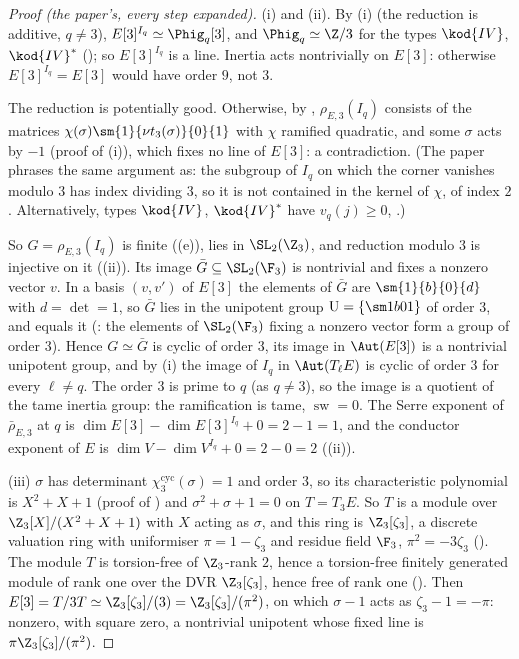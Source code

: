 \begin{proof}[Proof (the paper's, every step expanded)]
(i) and (ii). By (i) (the reduction is additive, $q\ne3$), $E[3]^{I_q}\simeq\Phig_q[3]$, and $\Phig_q\simeq\Z/3$ for the types
$\kod{IV}$, $\kod{IV}^*$ (); so $E[3]^{I_q}$ is a line. Inertia acts nontrivially on $E[3]$: otherwise $E[3]^{I_q}=E[3]$ would have order $9$, not $3$.

The reduction is potentially good. Otherwise, by , $\rho_{E,3}(I_q)$ consists of the matrices
$\chi(\sigma)\sm{1}{\nu t_3(\sigma)}{0}{1}$ with $\chi$ ramified quadratic, and some $\sigma$ acts by $-1$ (proof of (i)), which fixes no line of $E[3]$: a contradiction. (The paper phrases the same
argument as: the subgroup of $I_q$ on which the corner vanishes modulo $3$ has index dividing $3$, so it is not contained in the kernel of $\chi$,
of index $2$. Alternatively, types $\kod{IV}$, $\kod{IV}^*$ have $v_q(j)\ge0$, .)

So $G=\rho_{E,3}(I_q)$ is finite ((e)), lies in $\SL_2(\Z_3)$, and reduction modulo $3$ is injective on it
((ii)). Its image $\bar G\subseteq\SL_2(\F_3)$ is nontrivial and fixes a nonzero vector $v$. In a basis $(v,v')$ of $E[3]$ the elements
of $\bar G$ are $\sm{1}{b}{0}{d}$ with $d=\det=1$, so $\bar G$ lies in the unipotent group $\mathrm U=\{\sm1b01\}$ of order $3$, and equals it (:
the elements of $\SL_2(\F_3)$ fixing a nonzero vector form a group of order $3$). Hence $G\simeq\bar G$ is cyclic of order $3$, its image in $\Aut(E[3])$ is a
nontrivial unipotent group, and by (i) the image of $I_q$ in $\Aut(T_\ell E)$ is cyclic of order $3$ for every $\ell\ne q$. The order
$3$ is prime to $q$ (as $q\ne3$), so the image is a quotient of the tame inertia group: the ramification is tame, $\operatorname{sw}=0$. The Serre exponent of
$\bar\rho_{E,3}$ at $q$ is $\dim E[3]-\dim E[3]^{I_q}+0=2-1=1$, and the conductor exponent of $E$ is $\dim V-\dim V^{I_q}+0=2-0=2$
((ii)).

(iii) $\sigma$ has determinant $\chi_3^{\mathrm{cyc}}(\sigma)=1$ and order $3$, so its characteristic polynomial is $X^2+X+1$ (proof of
) and $\sigma^2+\sigma+1=0$ on $T=T_3E$. So $T$ is a module over $\Z_3[X]/(X^2+X+1)$ with $X$ acting as $\sigma$, and this ring is
$\Z_3[\zeta_3]$, a discrete valuation ring with uniformiser $\pi=1-\zeta_3$ and residue field $\F_3$, $\pi^2=-3\zeta_3$ (). The module $T$ is
torsion-free of $\Z_3$-rank $2$, hence a torsion-free finitely generated module of rank one over the DVR $\Z_3[\zeta_3]$, hence free of rank one
(). Then $E[3]=T/3T\simeq\Z_3[\zeta_3]/(3)=\Z_3[\zeta_3]/(\pi^2)$, on which $\sigma-1$ acts as $\zeta_3-1=-\pi$: nonzero, with square zero, a nontrivial
unipotent whose fixed line is $\pi\Z_3[\zeta_3]/(\pi^2)$.


\end{proof}
